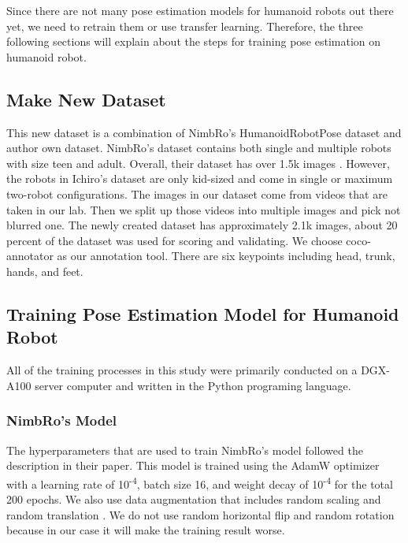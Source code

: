 Since there are not many pose estimation models for humanoid robots out there yet, we need to retrain them or use transfer learning.
Therefore, the three following sections will explain about the steps for training pose estimation on humanoid robot.

\subsection{Make New Dataset}
\label{subsec:make-new-dataset}

This new dataset is a combination of NimbRo's HumanoidRobotPose dataset \citep{amini2021} and author own dataset. NimbRo's dataset contains both single and multiple robots with size teen and adult.
Overall, their dataset has over 1.5k images \citep{amini2021}.
However, the robots in Ichiro's dataset are only kid-sized and come in single or maximum two-robot configurations. The images in our dataset come from videos that are taken in our lab. 
Then we split up those videos into multiple images and pick not blurred one.
The newly created dataset has approximately 2.1k images, about 20 percent of the dataset was used for scoring and validating. We choose coco-annotator as our annotation tool. There are six keypoints including head, trunk, hands, and feet.


\subsection{Training Pose Estimation Model for Humanoid Robot}
\label{subsec:training-robot}

All of the training processes in this study were primarily conducted on a DGX-A100 server computer and written in the Python programing language.

\subsubsection{NimbRo's Model}
\label{subsubsec:training-nimbro-model}

The hyperparameters that are used to train NimbRo's model followed the description in their paper.
This model is trained using the AdamW optimizer with a learning rate of 10\textsuperscript{-4},
batch size 16, and weight decay of 10\textsuperscript{-4} for the total 200 epochs.
We also use data augmentation that includes random scaling and random translation \citep{amini2021}.
We do not use random horizontal flip and random rotation because in our case it will make the training result worse.


